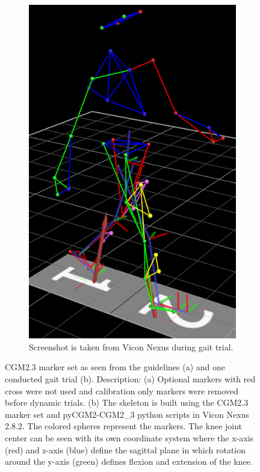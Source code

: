 \documentclass[../main.tex]{subfiles}
\begin{document}
\begin{figure}
\begin{subfigure}[b]{0.4\textwidth}
         \includegraphics[width=\textwidth]{img/experiment_capture2.png}
         \caption{Screenshot is taken from Vicon Nexus during gait trial.}
         \label{fig:cgm23-markerset-experiment-capture}
     \end{subfigure}
    \caption{CGM2.3 marker set as seen from the guidelines (a) and one conducted gait trial (b). Description: (a) Optional markers with red cross were not used and calibration only markers were removed before dynamic trials. (b) The skeleton is built using the CGM2.3 marker set and pyCGM2-CGM2\_3 python scripts in Vicon Nexus 2.8.2. The colored spheres represent the markers. The knee joint center can be seen with its own coordinate system where the x-axis (red) and z-axis (blue) define the sagittal plane in which rotation around the y-axis (green) defines flexion and extension of the knee.}
    \label{fig:cgm23-markerset}
\end{figure}
\end{document}
